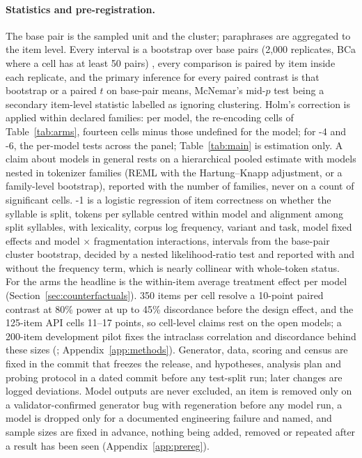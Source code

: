 \paragraph{Statistics and pre-registration.}
The base pair is the sampled unit and the cluster; paraphrases are aggregated to the item level. Every interval is a bootstrap over base pairs (2,000 replicates, BCa where a cell has at least 50 pairs) \citep{2411.00640}, every comparison is paired by item inside each replicate, and the primary inference for every paired contrast is that bootstrap or a paired $t$ on base-pair means, McNemar's mid-$p$ test \citep{P18-1128} being a secondary item-level statistic labelled as ignoring clustering. Holm's correction \citep{holm-1979-simple,Q17-1033} is applied within declared families: per model, the re-encoding cells of Table~\ref{tab:arms}, fourteen cells minus those undefined for the model; for \hyp{4} and \hyp{6}, the per-model tests across the panel; Table~\ref{tab:main} is estimation only. A claim about models in general rests on a hierarchical pooled estimate with models nested in tokenizer families (REML with the Hartung--Knapp adjustment, or a family-level bootstrap), reported with the number of families, never on a count of significant cells. \hyp{1} is a logistic regression of item correctness on whether the syllable is split, tokens per syllable centred within model and alignment among split syllables, with lexicality, corpus log frequency, variant and task, model fixed effects and model $\times$ fragmentation interactions, intervals from the base-pair cluster bootstrap, decided by a nested likelihood-ratio test and reported with and without the frequency term, which is nearly collinear with whole-token status. For the arms the headline is the within-item average treatment effect per model (Section~\ref{sec:counterfactuals}). 350 items per cell resolve a 10-point paired contrast at 80\% power at up to 45\% discordance before the design effect, and the 125-item API cells 11--17 points, so cell-level claims rest on the open models; a 200-item development pilot fixes the intraclass correlation and discordance behind these sizes (; Appendix~\ref{app:methods}). Generator, data, scoring and census are fixed in the commit that freezes the release, and hypotheses, analysis plan and probing protocol in a dated commit before any test-split run; later changes are logged deviations. Model outputs are never excluded, an item is removed only on a validator-confirmed generator bug with regeneration before any model run, a model is dropped only for a documented engineering failure and named, and sample sizes are fixed in advance, nothing being added, removed or repeated after a result has been seen (Appendix~\ref{app:prereg}).
